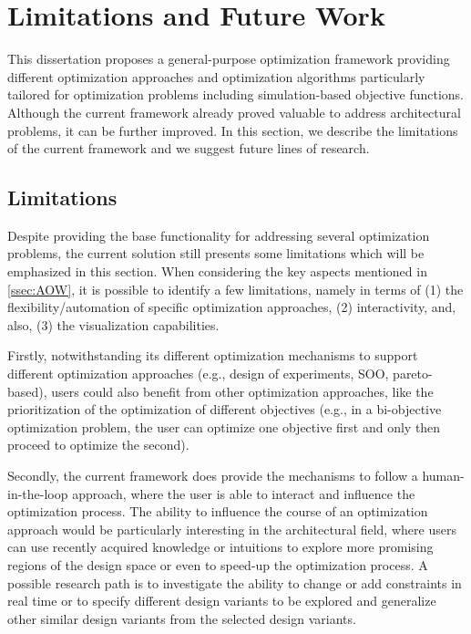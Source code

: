 

\section{Limitations and Future Work}

This dissertation proposes a general-purpose optimization framework providing different optimization approaches and optimization algorithms particularly tailored for optimization problems including simulation-based objective functions. Although the current framework already proved valuable to address architectural problems, it can be further improved. In this section, we describe the limitations of the current framework and we suggest future lines of research.

\subsection{Limitations}

Despite providing the base functionality for addressing several optimization problems, the current solution still presents some limitations which will be emphasized in this section. When considering the key aspects mentioned in \cref{ssec:AOW}, it is possible to identify a few limitations, namely in terms of (1) the flexibility/automation of specific optimization approaches, (2) interactivity, and, also, (3) the visualization capabilities.

Firstly, notwithstanding its different optimization mechanisms to support different optimization approaches (e.g., design of experiments, \ac{SOO}, pareto-based), users could also benefit from other optimization approaches, like the prioritization of the optimization of different objectives (e.g., in a bi-objective optimization problem, the user can optimize one objective first and only then proceed to optimize the second). 

Secondly, the current framework does provide the mechanisms to follow a human-in-the-loop approach, where the user is able to interact and influence the optimization process. The ability to influence the course of an optimization approach would be particularly interesting in the architectural field, where users can use recently acquired knowledge or intuitions to explore more promising regions of the design space or even to speed-up the optimization process. A possible research path is to investigate the ability to change or add constraints in real time or to specify different design variants to be explored and generalize other similar design variants from the selected design variants.

